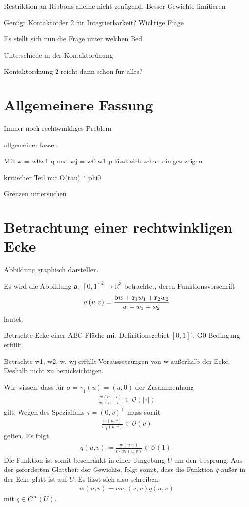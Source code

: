 \documentclass[10pt,a4paper,oneside]{report}
\newcommand{\R}{\mathbb{R}}
\newcommand{\OL}{\mathcal{O}}
\begin{document}
Restriktion an Ribbons alleine nicht genügend. 
Besser Gewichte limitieren

Genügt Kontaktorder 2 für Integrierbarkeit? Wichtige Frage

Es stellt sich nun die Frage unter welchen Bed

Unterschiede in der Kontaktordnung

Kontaktordnung 2 reicht dann schon für  alles?


\chapter{Allgemeinere Fassung}
Immer noch rechtwinkliges Problem

allgemeiner fassen

Mit w = w0w1 q und wj = w0 w1 p lässt sich schon einiges zeigen

kritischer Teil nur O(tau) * phi0

Grenzen untersuchen

\chapter{Betrachtung einer rechtwinkligen Ecke}
Abbildung graphisch darstellen. 

Es wird die Abbildung $\bold{a}$: $\left[0,1\right]^2 \to \R^3$ betrachtet, deren Funktionsvorschrift 
\begin{align*}
a\left(u,v\right) = \frac{\bold{b} w + \bold{r}_1 w_1 + \bold{r}_2 w_2}{w+w_1+w_2}
\end{align*}
lautet.

Betrachte Ecke einer ABC-Fläche mit Definitionsgebiet $\left[0,1\right]^2$.
G0 Bedingung erfüllt

Betrachte w1, w2, w.
wj erfüllt Voraussetzungen von w außerhalb der Ecke. Deshalb nicht zu berücksichtigen.

Wir wissen, dass für $\sigma = \gamma_1\left(u\right) = \left(u,0\right)$ der Zusammenhang
\begin{align*}
\frac{w\left(\sigma + \tau\right)}{w_1\left(\sigma + \tau\right)} \in \OL\left(|\tau|\right)
\end{align*}
gilt.
Wegen des Spezialfalls $\tau = \left( 0, v\right)^{\top}$ muss somit
\begin{align*}
\frac{w\left(u,v\right)}{w_1\left(u,v\right)} \in \OL\left(v\right)
\end{align*}
gelten.
Es folgt
\begin{align*}
q\left(u,v\right) \coloneqq \frac{w\left(u,v\right)}{v \cdot w_1\left(u,v\right)} \in \OL\left(1\right).
\end{align*}
Die Funktion ist somit beschränkt in einer Umgebung $U$ um den Ursprung. 
Aus der geforderten Glattheit der Gewichte, folgt somit, dass die Funktion $q$ außer in der Ecke glatt ist auf $U$.
Es lässt sich also schreiben:
\begin{align*}
w\left(u,v\right) = v w_1\left(u,v\right) q\left(u,v\right)
\end{align*}
mit $q \in C^\infty\left(U\right)$.
\end{document}
